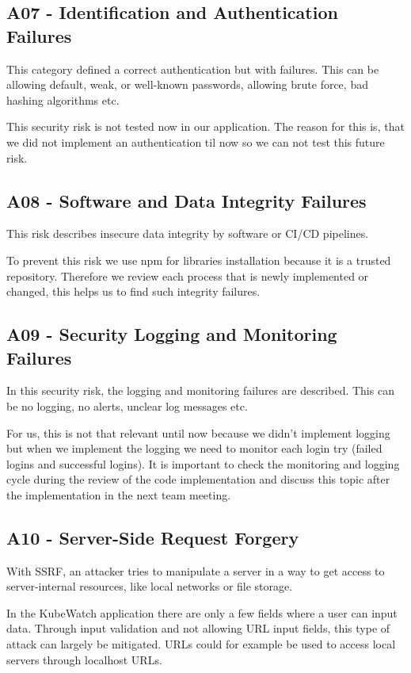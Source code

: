 \subsection{A07 - Identification and Authentication Failures}
This category defined a correct authentication but with failures. This can be allowing default, weak, or well-known passwords, allowing brute force, bad hashing algorithms etc.

This security risk is not tested now in our application. The reason for this is, that we did not implement an authentication til now so we can not test this future risk.

\subsection{A08 - Software and Data Integrity Failures}
This risk describes insecure data integrity by software or CI/CD pipelines.

To prevent this risk we use npm for libraries installation because it is a trusted repository. Therefore we review each process that is newly implemented or changed, this helps us to find such integrity failures.

\subsection{A09 - Security Logging and Monitoring Failures}
In this security risk, the logging and monitoring failures are described. This can be no logging, no alerts, unclear log messages etc.

For us, this is not that relevant until now because we didn't implement logging but when we implement the logging we need to monitor each login try (failed logins and successful logins). It is important to check the monitoring and logging cycle during the review of the code implementation and discuss this topic after the implementation in the next team meeting.

\subsection{A10 - Server-Side Request Forgery}
With SSRF, an attacker tries to manipulate a server in a way to get access to server-internal resources, like local networks or file storage.

In the KubeWatch application there are only a few fields where a user can input data. Through input validation and not allowing URL input fields, this type of attack can largely be mitigated. URLs could for example be used to access local servers through localhost URLs.

